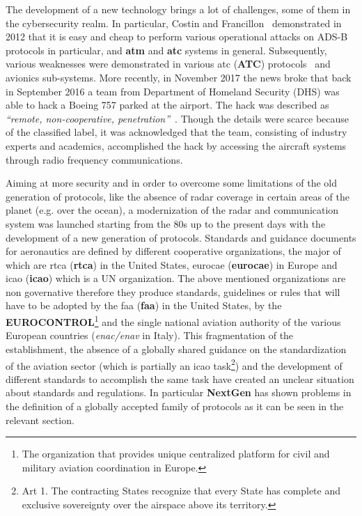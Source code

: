 \documentclass[../main.tex]{subfiles}
\begin{document}
The development of a new technology brings a lot of challenges, some of them in the cybersecurity realm.
In particular, Costin and Francillon~\cite{costin2012ghost} demonstrated in 2012
that it is easy and cheap to perform various operational attacks on ADS-B
protocols in particular, and \textbf{\acrshort{atm}} and \textbf{\acrshort{atc}}
systems in general.
Subsequently, various weaknesses were demonstrated in various \acrlong{atc} (\textbf{ATC}) protocols~\cite{renderman,teso} and avionics sub-systems.
More recently, in November 2017 the news broke that back in September 2016 a
team from Department of Homeland Security (DHS) was able to hack a Boeing 757
parked at the airport. The hack was described as \emph{``remote,
non-cooperative, penetration''}~\cite{news-boeinghack-cso}.
Though the details were scarce because of the classified label, it was
acknowledged that the team, consisting of industry experts and academics,
accomplished the hack by accessing the aircraft systems through radio frequency
communications.

Aiming at more security and in order to overcome some limitations of the old
generation of protocols, like the absence of radar coverage in certain areas of
the planet (e.g. over the ocean), a modernization of the radar and communication
system was launched starting from the 80s up to the present days with the
development of a new generation of protocols. Standards and guidance documents
for aeronautics are defined by different cooperative organizations, the major of
which are \acrlong{rtca} (\textbf{\acrshort{rtca}}) in the United States,
\acrlong{eurocae} (\textbf{\acrshort{eurocae}}) in Europe and \acrlong{icao}
(\textbf{\acrshort{icao}}) which is a UN organization. The above mentioned
organizations are non governative therefore they produce standards, guidelines
or rules that will have to be adopted by the \acrlong{faa}
(\textbf{\acrshort{faa}}) in the United States, by the
\textbf{EUROCONTROL}\footnote{The organization that provides unique centralized
platform for civil and military aviation coordination in Europe.} and the single
national aviation authority of the various European countries
(\textit{\acrshort{enac}/\acrshort{enav}} in Italy). This fragmentation of the
establishment, the absence of a globally shared guidance on the standardization
of the aviation sector (which is partially an \acrshort{icao} task\footnote{Art
1. The contracting States recognize that every  State has complete and exclusive
sovereignty over the airspace above its territory.\cite{icao7300}}) and the
development of different standards to accomplish the same task have created an
unclear situation about standards and regulations. In particular
\textbf{NextGen} has shown problems in the definition of a globally accepted
family of protocols as it can be seen in the relevant section.
\end{document}
